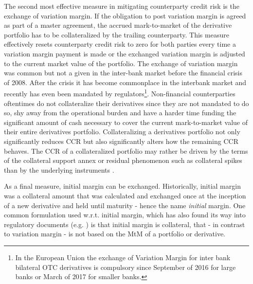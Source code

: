 \documentclass[../Thesis_AHoecherl.tex]{subfiles}
\begin{document}
The second most effective measure in mitigating counterparty credit risk is the exchange of variation margin. If the obligation to post variation margin is agreed as part of a master agreement, the accrued mark-to-market of the derivative portfolio has to be collateralized by the trailing counterparty. This measure effectively resets counterparty credit risk to zero for both parties every time a variation margin payment is made or the exchanged variation margin is adjusted to the current market value of the portfolio. The exchange of variation margin was common but not a given in the inter-bank market before the financial crisis of 2008. After the crisis it has become commonplace in the interbank market and recently has even been mandated by regulators\footnote{In the European Union the exchange of Variation Margin for inter bank bilateral \gls{OTC} derivatives is compulsory since September of 2016 for large banks or March of 2017 for smaller banks.}. Non-financial counterparties oftentimes do not collateralize their derivatives since they are not mandated to do so, shy away from the operational burden and have a harder time funding the significant amount of cash necessary to cover the current mark-to-market value of their entire derivatives portfolio. Collateralizing a derivatives portfolio not only significantly reduces \gls{CCR} but also significantly alters how the remaining \gls{CCR} behaves. The \gls{CCR} of a collateralized portfolio may rather be driven by the terms of the collateral support annex or residual phenomenon such as collateral spikes than by the underlying instruments \cite{andersen2017does}. 

As a final measure, initial margin can be exchanged. Historically, initial margin was a collateral amount that was calculated and exchanged once at the inception of a new derivative and held until maturity - hence the name \emph{initial} margin. One common formulation used w.r.t. initial margin, which has also found its way into regulatory documents (e.g. \cite[Article 52.16]{CRE52}) is that initial margin is collateral, that - in contrast to variation margin - is not based on the \gls{MtM} of a portfolio or derivative. 
\end{document}
